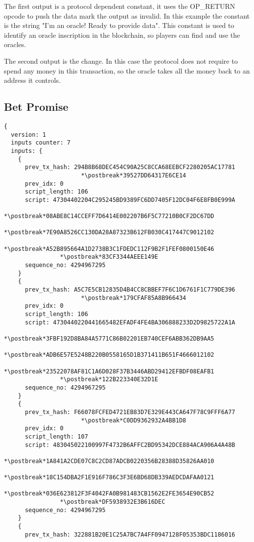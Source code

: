 The first output is a protocol dependent constant, it uses the OP\_RETURN opcode
  to push the data mark the output as invalid.
In this example the constant is the string
  "I'm an oracle! Ready to provide data".
This constant is used to identify an oracle inscription in the blockchain, so
  players can find and use the oracles.

The second output is the change.
In this case the protocol does not require to spend any money in this
  transaction, so the oracle takes all the money back to an address it controls.

\subsection{Bet Promise}

\begin{lstlisting}
{
  version: 1
  inputs counter: 7
  inputs: {
    {
      prev_tx_hash: 294B8B68DEC454C90A25C8CCA68EEBCF2280205AC17781
                      *\postbreak*39527DD64317E6CE14
      prev_idx: 0
      script_length: 106
      script: 47304402204C295245BD9389FC6DD7405F12DC04F6E8FB0E999A
                *\postbreak*08ABE8C14CCEFF7D6414E002207B6F5C77210B0CF2DC67DD
                *\postbreak*7E90A8526CC130DA28A87323B612FB030C417447C9012102
                *\postbreak*A52B895664A1D2738B3C1FDEDC112F9B2F1FEF0800150E46
                *\postbreak*83CF3344AEEE149E
      sequence_no: 4294967295
    }
    {
      prev_tx_hash: A5C7E5CB12835D4B4CC8CBBEF7F6C1D6761F1C779DE396
                      *\postbreak*179CFAF85A8B966434
      prev_idx: 0
      script_length: 106
      script: 4730440220441665482EFADF4FE4BA306888233D2D9825722A1A
                *\postbreak*3FBF192D8BA84A5771C86B02201EB740CEF6ABB362DB9AA5
                *\postbreak*ADB6E57E5248B220B0558165D1B371411B651F4666012102
                *\postbreak*23522078AF81C1A6D028F37B3446ABD29412EFBDF08EAFB1
                *\postbreak*122B223340E32D1E
      sequence_no: 4294967295
    }
    {
      prev_tx_hash: F66078FCFED4721EB83D7E329E443CA647F78C9FFF6A77
                      *\postbreak*C0DD9362932A4BB1D8
      prev_idx: 0
      script_length: 107
      script: 483045022100997F4732B6AFFC2BD95342DCE884ACA906A4A48B
                *\postbreak*1A841A2CDE07C8C2CD87ADCB0220356B28388D35826AA010
                *\postbreak*18C154DBA2F1E916F786C3F3E6BD68DB339AEDCDAFAA0121
                *\postbreak*036E623812F3F4042FA0B981483CB1562E2FE3654E90CB52
                *\postbreak*DF5938932E3B616DEC
      sequence_no: 4294967295
    }
    {
      prev_tx_hash: 322881B20E1C25A7BC7A4FF0947128F05353BDC1186016

\end{lstlisting}
